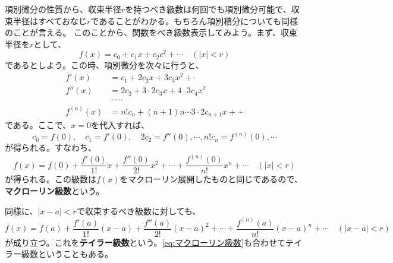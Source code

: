 \documentclass[a4j,dvipdfmx]{jsarticle}
\begin{document}
                項別微分の性質から、収束半径$r$を持つべき級数は何回でも項別微分可能で、収束半径はすべておなじ$r$であることがわかる。もちろん項別積分についても同様のことが言える。
                このことから、関数をべき級数表示してみよう。まず、収束半径を$r$として、
                \begin{equation*}
                    f(x)=c_0+c_1x+c_2c^2+\cdots\quad (|x|<r)
                \end{equation*}
                であるとしよう。この時、項別微分を次々に行うと、
                \begin{align*}
                    f'(x)&=c_1+2c_2x+3c_3x^2+\cdot\\
                    f''(x)&=2c_2+3\cdot 2 c_3x+4\cdot 3c_{4}x^2\\
                    &\cdots\cdots\\
                    f^{(n)}(x)&=n!c_n+(n+1)n\cdots3\cdot2c_{n+1}x+\cdots
                \end{align*}
                である。ここで、$x=0$を代入すれば、
                \begin{equation*}
                    c_0=f(0),\quad c_1=f'(0),\quad 2c_2=f''(0),\cdots,n!c_n = f^{(n)}(0),\cdots
                \end{equation*}
                が得られる。すなわち、
                \begin{equation}
                    f(x)=f(0)+\frac{f'(0)}{1!}x+\frac{f''(0)}{2!}x^2+\cdots+\frac{f^{(n)}(0)}{n!}x^n+\cdots\quad(|x|<r)\label{eq:マクローリン級数}
                \end{equation}
                が得られる。この級数は$f(x)$をマクローリン展開したものと同じであるので、\textbf{マクローリン級数}という。

                同様に、$|x-a|<r$で収束するべき級数に対しても、
                \begin{equation}
                    f(x)=f(a)+\frac{f'(a)}{1!}(x-a)+\frac{f''(a)}{2!}(x-a)^2+\cdots+\frac{f^{(n)}(a)}{n!}(x-a)^n+\cdots\quad(|x-a|<r)\label{eq:テイラー級数}
                \end{equation}
                が成り立つ。これを\textbf{テイラー級数}という。\eqref{eq:マクローリン級数}も合わせてテイラー級数ということもある。
\end{document}
